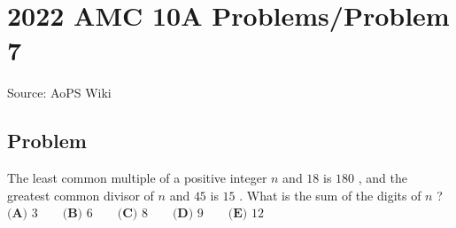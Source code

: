 \documentclass[12pt]{article}
\begin{document}
\section*{{2022 AMC 10A Problems/Problem 7}}
Source: AoPS Wiki

\subsection*{Problem}
The least common multiple of a positive integer $n$ and $18$ is $180$ , and the greatest common divisor of $n$ and $45$ is $15$ . What is the sum of the digits of $n$ ? $\textbf{(A) } 3 \qquad \textbf{(B) } 6 \qquad \textbf{(C) } 8 \qquad \textbf{(D) } 9 \qquad \textbf{(E) } 12$
\end{document}
